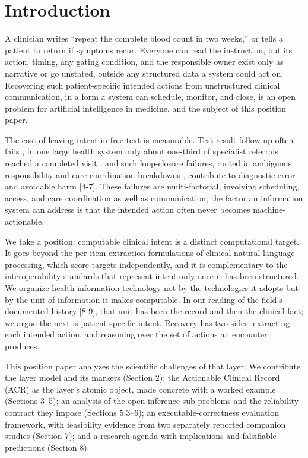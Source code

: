 \section{Introduction}\label{introduction}

A clinician writes ``repeat the complete blood count in two weeks,'' or tells a patient to return if symptoms recur. Everyone can read the instruction, but its action, timing, any gating condition, and the responsible owner exist only as narrative or go unstated, outside any structured data a system could act on. Recovering such patient-specific intended actions from unstructured clinical communication, in a form a system can schedule, monitor, and close, is an open problem for artificial intelligence in medicine, and the subject of this position paper.

The cost of leaving intent in free text is measurable. Test-result follow-up often fails \cite{ref1}, in one large health system only about one-third of specialist referrals reached a completed visit \cite{ref2}, and such loop-closure failures, rooted in ambiguous responsibility and care-coordination breakdowns \cite{ref3}, contribute to diagnostic error and avoidable harm {[}4-7{]}. These failures are multi-factorial, involving scheduling, access, and care coordination as well as communication; the factor an information system can address is that the intended action often never becomes machine-actionable.

We take a position: computable clinical intent is a distinct computational target. It goes beyond the per-item extraction formulations of clinical natural language processing, which score targets independently, and it is complementary to the interoperability standards that represent intent only once it has been structured. We organize health information technology not by the technologies it adopts but by the unit of information it makes computable. In our reading of the field's documented history {[}8-9{]}, that unit has been the record and then the clinical fact; we argue the next is patient-specific intent. Recovery has two sides: extracting each intended action, and reasoning over the set of actions an encounter produces.

This position paper analyzes the scientific challenges of that layer. We contribute the layer model and its markers (Section 2); the Actionable Clinical Record (ACR) as the layer's atomic object, made concrete with a worked example (Sections 3--5); an analysis of the open inference sub-problems and the reliability contract they impose (Sections 5.3--6); an executable-correctness evaluation framework, with feasibility evidence from two separately reported companion studies (Section 7); and a research agenda with implications and falsifiable predictions (Section 8).

